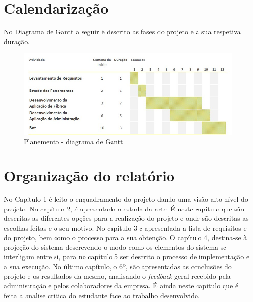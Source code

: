 \section{Calendarização}
No Diagrama de Gantt a seguir é descrito as fases do projeto e a sua respetiva duração.

\begin{figure}[htbp] 
	\begin{center}
		\includegraphics[width=\textwidth,keepaspectratio]{figuras/DiagramaGant.jpg}
		\caption{Planemento - diagrama de Gantt}
		\label{fig:gantt chart} 
	\end{center}
\end{figure}

\section{Organização do relatório}
No Capítulo 1 é feito o enquadramento do projeto dando uma visão alto nível do projeto. No capítulo 2, é apresentado o estado da arte. É neste capitulo que são descritas as diferentes opções para a realização do projeto e onde são descritas as escolhas feitas e o seu motivo. No capítulo 3 é apresentada a lista de requisitos e do projeto, bem como o processo para a sua obtenção. O capítulo 4, destina-se à projeção do sistema descrevendo o modo como os elementos do sistema se interligam entre si, para no capítulo 5 ser descrito o processo de implementação e a sua execução. No último capítulo, o 6º, são apresentadas as conclusões do projeto e os resultados da mesmo, analisando o \textit{feedback} geral recebido pela administração e pelos colaboradores da empresa. É ainda neste capitulo que é feita a analise critica do estudante face ao trabalho desenvolvido.
